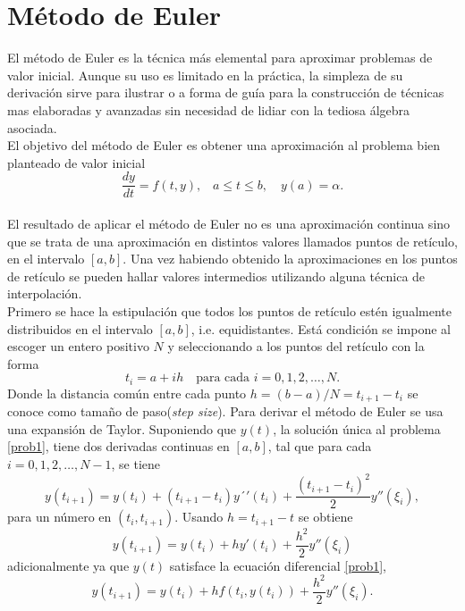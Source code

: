 \documentclass[a4paper]{article}
\begin{document}
\section{Método de Euler}
El método de Euler es la técnica más elemental para aproximar problemas de valor inicial. Aunque su uso es limitado en la práctica, la simpleza de su derivación sirve para ilustrar o a forma de guía para la construcción de técnicas mas elaboradas y avanzadas sin necesidad de lidiar con la tediosa álgebra asociada.\\
El objetivo del método de Euler es obtener una aproximación al problema bien planteado de valor inicial
\begin{equation}\label{prob1}
\frac{dy}{dt}=f(t,y), \,\,\,\,\, a \leq t \leq b, \,\,\,\,\,\, y(a)=\alpha.
\end{equation}\\
El resultado de aplicar el método de Euler no es una aproximación continua sino que se trata de una aproximación en distintos valores llamados puntos de retículo, en el intervalo $[a,b]$. Una vez habiendo obtenido la aproximaciones en los puntos de retículo se pueden hallar valores intermedios utilizando alguna técnica de interpolación.\\
Primero se hace la estipulación que todos los puntos de retículo estén igualmente distribuidos en el intervalo $[a,b]$, i.e. equidistantes. Está condición se impone al escoger un entero positivo $N$ y seleccionando a los puntos del retículo con la forma
\begin{equation*}
t_i =a +i h \,\,\,\,\,\, \text{para cada } i=0,1,2,\hdots, N.
\end{equation*}
Donde la distancia común entre cada punto $h=(b-a)/N=t_{i+1}-t_i$ se conoce como tamaño de paso(\textit{step size}). Para derivar el método de Euler se usa una expansión de Taylor. Suponiendo que $y(t)$, la solución única al problema \ref{prob1}, tiene dos derivadas continuas en $[a,b]$, tal que para cada $i=0,1,2,\hdots, N-1$, se tiene
\begin{equation*}
y(t_{i+1})=y(t_i)+(t_{i+1}-t_i)y´'(t_i) + \frac{(t_{i+1}-t_i)^2}{2}y''(\xi_i),
\end{equation*}
para un número en $(t_i, t_{i+1})$. Usando $h=t_{i+1}-t$ se obtiene
\begin{equation*}
y(t_{i+1})=y(t_i)+h y'(t_i)+\frac{h^2}{2}y''(\xi_i)
\end{equation*}
adicionalmente ya que $y(t)$ satisface la ecuación diferencial \ref{prob1},
\begin{equation}\label{euler_method1}
y(t_{i+1})=y(t_i)+ h f(t_i,y(t_i))+\frac{h^2}{2}y''(\xi_i).
\end{equation}
\end{document}
